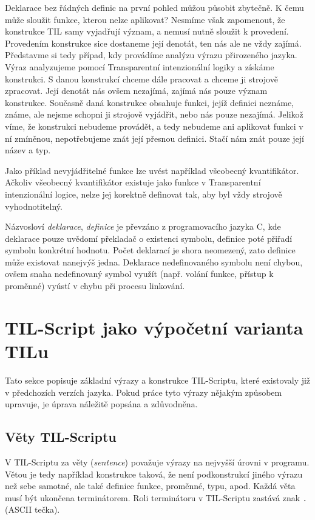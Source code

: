 Deklarace bez řádných definic na první pohled můžou působit zbytečně. K čemu může sloužit funkce,
kterou nelze aplikovat? Nesmíme však zapomenout, že konstrukce TIL samy vyjadřují význam, a nemusí
nutně sloužit k provedení. Provedením konstrukce sice dostaneme její denotát, ten nás ale ne vždy
zajímá. Představme si tedy případ, kdy provádíme analýzu výrazu přirozeného jazyka. Výraz
analyzujeme pomocí Transparentní intenzionální logiky a získáme konstrukci. S danou konstrukcí
chceme dále pracovat a chceme ji strojově zpracovat. Její denotát nás ovšem nezajímá, zajímá nás
pouze význam konstrukce. Současně daná konstrukce obsahuje funkci, jejíž definici neznáme, známe,
ale nejsme schopni ji strojově vyjádřit, nebo nás pouze nezajímá. Jelikož víme, že konstrukci
nebudeme provádět, a tedy nebudeme ani aplikovat funkci v ní zmíněnou, nepotřebujeme znát její
přesnou definici. Stačí nám znát pouze její název a typ.

Jako příklad nevyjádřitelné funkce lze uvést například všeobecný kvantifikátor. Ačkoliv všeobecný
kvantifikátor existuje jako funkce v Transparentní intenzionální logice, nelze jej korektně
definovat tak, aby byl vždy strojově vyhodnotitelný.

Názvosloví \textit{deklarace}, \textit{definice} je převzáno z programovacího jazyka C, kde
deklarace pouze uvědomí překladač o existenci symbolu, definice poté přiřadí symbolu konkrétní
hodnotu. Počet deklarací je shora neomezený, zato definice může existovat nanejvýš jedna. Deklarace
nedefinovaného symbolu není chybou, ovšem snaha nedefinovaný symbol využít (např. volání funkce,
přístup k proměnné) vyústí v chybu při procesu linkování.

\section{TIL-Script jako výpočetní varianta TILu}

Tato sekce popisuje základní výrazy a konstrukce TIL-Scriptu, které existovaly již v předchozích
verzích jazyka. Pokud práce tyto výrazy nějakým způsobem upravuje, je úprava náležitě popsána
a zdůvodněna.

\subsection{Věty TIL-Scriptu}

V TIL-Scriptu za věty (\textit{sentence}) považuje výrazy na nejvyšší úrovni v programu. Větou je
tedy například konstrukce taková, že není podkonstrukcí jiného výrazu než sebe samotné, ale také
definice funkce, proměnné, typu, apod. Každá věta musí být ukončena terminátorem. Roli terminátoru
v TIL-Scriptu zastává znak \lstinline{.} (ASCII tečka).

